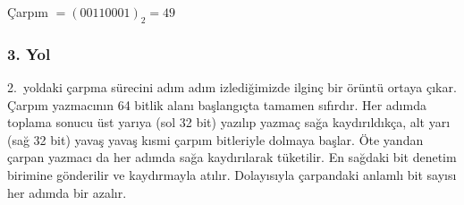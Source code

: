 \begin{ornek}[5.5]
Çarpım $= (00110001)_2 = 49$
\end{ornek}

\subsubsection{3. Yol}

2.\ yoldaki çarpma sürecini adım adım izlediğimizde ilginç bir örüntü ortaya çıkar. Çarpım yazmacının 64 bitlik alanı başlangıçta tamamen sıfırdır. Her adımda toplama sonucu üst yarıya (sol 32 bit) yazılıp yazmaç sağa kaydırıldıkça, alt yarı (sağ 32 bit) yavaş yavaş kısmi çarpım bitleriyle dolmaya başlar. Öte yandan çarpan yazmacı da her adımda sağa kaydırılarak tüketilir. En sağdaki bit denetim birimine gönderilir ve kaydırmayla atılır. Dolayısıyla çarpandaki anlamlı bit sayısı her adımda bir azalır.

